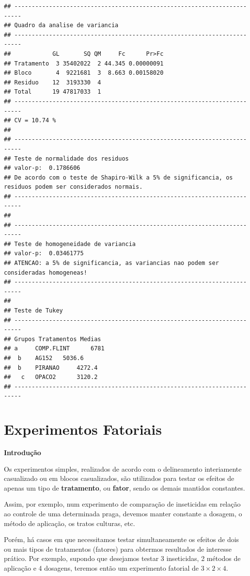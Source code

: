 \documentclass[
]{book}
\begin{document}
\begin{verbatim}
## ------------------------------------------------------------------------
## Quadro da analise de variancia
## ------------------------------------------------------------------------
##            GL       SQ QM     Fc      Pr>Fc
## Tratamento  3 35402022  2 44.345 0.00000091
## Bloco       4  9221681  3  8.663 0.00158020
## Residuo    12  3193330  4                  
## Total      19 47817033  1                  
## ------------------------------------------------------------------------
## CV = 10.74 %
## 
## ------------------------------------------------------------------------
## Teste de normalidade dos residuos 
## valor-p:  0.1786606 
## De acordo com o teste de Shapiro-Wilk a 5% de significancia, os residuos podem ser considerados normais.
## ------------------------------------------------------------------------
## 
## ------------------------------------------------------------------------
## Teste de homogeneidade de variancia 
## valor-p:  0.03461775 
## ATENCAO: a 5% de significancia, as variancias nao podem ser consideradas homogeneas!
## ------------------------------------------------------------------------
## 
## Teste de Tukey
## ------------------------------------------------------------------------
## Grupos Tratamentos Medias
## a     COMP.FLINT      6781 
##  b    AG152   5036.6 
##  b    PIRANAO     4272.4 
##   c   OPACO2      3120.2 
## ------------------------------------------------------------------------
\end{verbatim}

\hypertarget{experimentos-fatoriais}{%
\chapter{Experimentos Fatoriais}\label{experimentos-fatoriais}}

\textbf{Introdução}

Os experimentos simples, realizados de acordo com o delineamento interiamente casualizado ou em blocos casualizados, são utilizados para testar os efeitos de apenas um tipo de \textbf{tratamento}, ou \textbf{fator}, sendo os demais mantidos constantes.

Assim, por exemplo, num experimento de comparação de inseticidas em relação ao controle de uma determinada praga, devemos manter constante a dosagem, o método de aplicação, os tratos culturas, etc.

Porém, há casos em que necessitamos testar simultaneamente os efeitos de dois ou mais tipos de tratamentos (fatores) para obtermos resultados de interesse prático. Por exemplo, supondo que desejamos testar 3 inseticidas, 2 métodos de aplicação e 4 dosagens, teremos então um experimento fatorial de \(3\times2\times4\).
\end{document}
